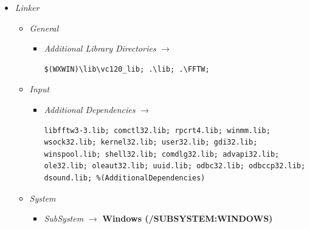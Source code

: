 \documentclass[12pt]{report}
\begin{document}
\begin{appendices}
\begin{itemize}
\begin{itemize}
\begin{itemize}
				\item \emph{Preprocessor}
				\begin{itemize} %
					\item \emph{Preprocessor Definitions} $\rightarrow$
\begin{lstlisting}
_MT; _WINDOWS; WINVER=0x0400; __WXMSW__; wxUSE_GUI=1; _CRT_SECURE_NO_DEPRECATE; _CRT_NONSTDC_NO_DEPRECATE; WIN32; __WINDOWS_DS__; __WINDOWS_ASIO__; __WINDOWS_WASAPI__; _CONSOLE; _MBCS; _UNICODE; _LIB; %(PreprocessorDefinitions)
\end{lstlisting}				
				\end{itemize} %
			\end{itemize} %
			\item \emph{Linker}
			\begin{itemize} %
				\item \emph{General}
				\begin{itemize} %
					\item \emph{Additional Library Directories} $\rightarrow$
\begin{lstlisting}
$(WXWIN)\lib\vc120_lib; .\lib; .\FFTW;
\end{lstlisting}
				\end{itemize} %
				\item \emph{Input}
				\begin{itemize} %
					\item \emph{Additional Dependencies} $\rightarrow$
\begin{lstlisting}
libfftw3-3.lib; comctl32.lib; rpcrt4.lib; winmm.lib; wsock32.lib; kernel32.lib; user32.lib; gdi32.lib; winspool.lib; shell32.lib; comdlg32.lib; advapi32.lib; ole32.lib; oleaut32.lib; uuid.lib; odbc32.lib; odbccp32.lib; dsound.lib; %(AdditionalDependencies)
\end{lstlisting}
				\end{itemize}  %
				\item \emph{System}
				\begin{itemize} %
					\item \emph{SubSystem} $\rightarrow$ {\bf Windows (/SUBSYSTEM:WINDOWS)}
				\end{itemize}  %
			\end{itemize}  %
		\end{itemize} %
	\end{itemize} %
	\clearpage



\end{appendices}
\end{document}
